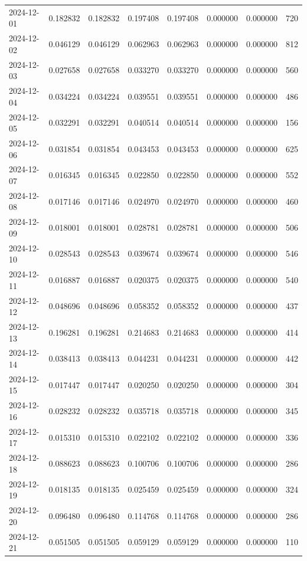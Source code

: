 \begin{tabular}{lrrrrrrr}
2024-12-01 & 0.182832 & 0.182832 & 0.197408 & 0.197408 & 0.000000 & 0.000000 & 720 \\
2024-12-02 & 0.046129 & 0.046129 & 0.062963 & 0.062963 & 0.000000 & 0.000000 & 812 \\
2024-12-03 & 0.027658 & 0.027658 & 0.033270 & 0.033270 & 0.000000 & 0.000000 & 560 \\
2024-12-04 & 0.034224 & 0.034224 & 0.039551 & 0.039551 & 0.000000 & 0.000000 & 486 \\
2024-12-05 & 0.032291 & 0.032291 & 0.040514 & 0.040514 & 0.000000 & 0.000000 & 156 \\
2024-12-06 & 0.031854 & 0.031854 & 0.043453 & 0.043453 & 0.000000 & 0.000000 & 625 \\
2024-12-07 & 0.016345 & 0.016345 & 0.022850 & 0.022850 & 0.000000 & 0.000000 & 552 \\
2024-12-08 & 0.017146 & 0.017146 & 0.024970 & 0.024970 & 0.000000 & 0.000000 & 460 \\
2024-12-09 & 0.018001 & 0.018001 & 0.028781 & 0.028781 & 0.000000 & 0.000000 & 506 \\
2024-12-10 & 0.028543 & 0.028543 & 0.039674 & 0.039674 & 0.000000 & 0.000000 & 546 \\
2024-12-11 & 0.016887 & 0.016887 & 0.020375 & 0.020375 & 0.000000 & 0.000000 & 540 \\
2024-12-12 & 0.048696 & 0.048696 & 0.058352 & 0.058352 & 0.000000 & 0.000000 & 437 \\
2024-12-13 & 0.196281 & 0.196281 & 0.214683 & 0.214683 & 0.000000 & 0.000000 & 414 \\
2024-12-14 & 0.038413 & 0.038413 & 0.044231 & 0.044231 & 0.000000 & 0.000000 & 442 \\
2024-12-15 & 0.017447 & 0.017447 & 0.020250 & 0.020250 & 0.000000 & 0.000000 & 304 \\
2024-12-16 & 0.028232 & 0.028232 & 0.035718 & 0.035718 & 0.000000 & 0.000000 & 345 \\
2024-12-17 & 0.015310 & 0.015310 & 0.022102 & 0.022102 & 0.000000 & 0.000000 & 336 \\
2024-12-18 & 0.088623 & 0.088623 & 0.100706 & 0.100706 & 0.000000 & 0.000000 & 286 \\
2024-12-19 & 0.018135 & 0.018135 & 0.025459 & 0.025459 & 0.000000 & 0.000000 & 324 \\
2024-12-20 & 0.096480 & 0.096480 & 0.114768 & 0.114768 & 0.000000 & 0.000000 & 286 \\
2024-12-21 & 0.051505 & 0.051505 & 0.059129 & 0.059129 & 0.000000 & 0.000000 & 110 \\

\end{tabular}
